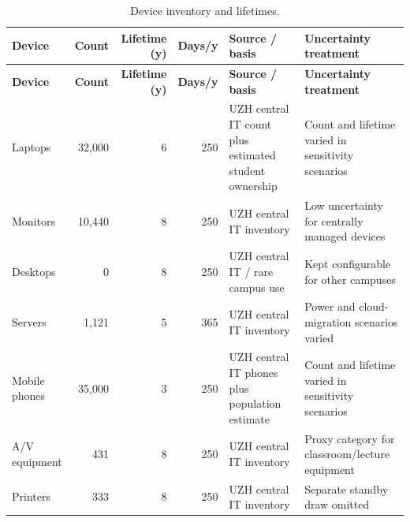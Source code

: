 {\footnotesize
\setlength{\tabcolsep}{2pt}
\renewcommand{\arraystretch}{1.12}

\begin{longtable}{|L{0.16\textwidth}|r|r|r|L{0.26\textwidth}|L{0.27\textwidth}|}
\caption{Device inventory and lifetimes.}\label{tab:param-devices}\\
\hline
\textbf{Device} & \textbf{Count} & \textbf{Lifetime (y)} & \textbf{Days/y} & \textbf{Source / basis} & \textbf{Uncertainty treatment} \\ \hline
\endfirsthead
\hline
\textbf{Device} & \textbf{Count} & \textbf{Lifetime (y)} & \textbf{Days/y} & \textbf{Source / basis} & \textbf{Uncertainty treatment} \\ \hline
\endhead
Laptops & 32,000 & 6 & 250 & UZH central IT count plus estimated student ownership & Count and lifetime varied in sensitivity scenarios \\ \hline
Monitors & 10,440 & 8 & 250 & UZH central IT inventory & Low uncertainty for centrally managed devices \\ \hline
Desktops & 0 & 8 & 250 & UZH central IT / rare campus use & Kept configurable for other campuses \\ \hline
Servers & 1,121 & 5 & 365 & UZH central IT inventory & Power and cloud-migration scenarios varied \\ \hline
Mobile phones & 35,000 & 3 & 250 & UZH central IT phones plus population estimate & Count and lifetime varied in sensitivity scenarios \\ \hline
A/V equipment & 431 & 8 & 250 & UZH central IT inventory & Proxy category for classroom/lecture equipment \\ \hline
Printers & 333 & 8 & 250 & UZH central IT inventory & Separate standby draw omitted \\ \hline
\end{longtable}

}
